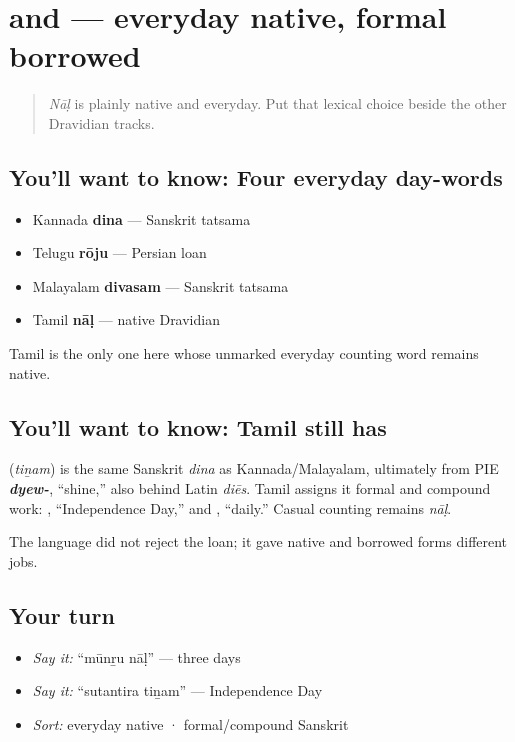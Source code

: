 \section[\texorpdfstring{\ta{நாள்} / \ta{தினம்} (nāḷ / tiṉam)}{நாள் / தினம் (nāḷ / tiṉam)}]{ and  — everyday native, formal borrowed}

\label{lesson:TA-C23-day-family-register}



\begin{quote}
\emph{Nāḷ} is plainly native and everyday. Put that lexical choice beside the other Dravidian tracks.
\end{quote}

\subsection*{You'll want to know: Four everyday day-words}
\begin{itemize}
\raggedright
  \item Kannada \textbf{dina} — Sanskrit tatsama
  \item Telugu \textbf{rōju} — Persian loan
  \item Malayalam \textbf{divasam} — Sanskrit tatsama
  \item Tamil \textbf{nāḷ} — native Dravidian
\end{itemize}

Tamil is the only one here whose unmarked everyday counting word remains native.

\subsection*{You'll want to know: Tamil still has }
\textbf{} (\emph{tiṉam}) is the same Sanskrit \emph{dina} as Kannada/Malayalam, ultimately from PIE \emph{\textbf{dyew-}}, \textquotedblleft{}shine,\textquotedblright{} also behind Latin \emph{diēs}. Tamil assigns it formal and compound work: \textbf{ }, \textquotedblleft{}Independence Day,\textquotedblright{} and \textbf{}, \textquotedblleft{}daily.\textquotedblright{} Casual counting remains \emph{nāḷ}.

The language did not reject the loan; it gave native and borrowed forms different jobs.

\subsection*{Your turn}
\begin{itemize}
\raggedright
  \item \emph{Say it:} \textquotedblleft{}mūnṟu nāḷ\textquotedblright{} — three days
  \item \emph{Say it:} \textquotedblleft{}sutantira tiṉam\textquotedblright{} — Independence Day
  \item \emph{Sort:} everyday native · formal/compound Sanskrit
\end{itemize}

